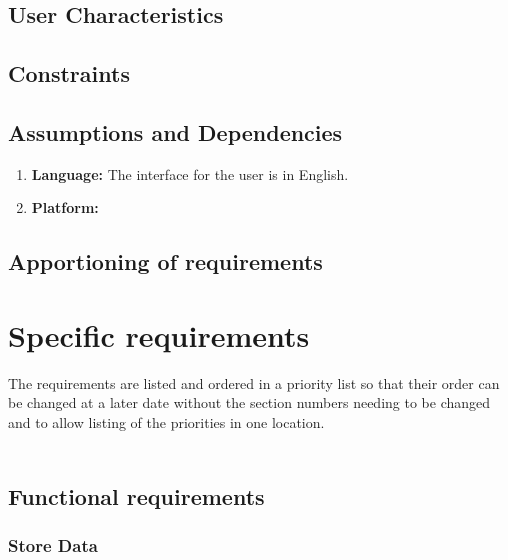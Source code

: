 \documentclass[12pt]{article}
\begin{document}
\subsection{User Characteristics}


\subsection{Constraints}

\subsection{Assumptions and Dependencies}
\begin{enumerate}
\item \textbf{Language:} The interface for the user is in English.
\item \textbf{Platform:} 
\end{enumerate}

\subsection{Apportioning of requirements}

\section{Specific requirements}
The requirements are listed and ordered in a priority list so that their order can be changed at a later date without the section numbers needing to be changed and to allow listing of the priorities in one location.\\
\\

\begin{comment}
The first 2 are to be considered absolutely critical. The software cannot be considered useful if those features are absent.

What are the security implications of storing identifiable time sheet info for employees??
\end{comment}

\subsection{Functional requirements}
 
\subsubsection{Store Data}\label{sec:Store Data}
\end{document}
